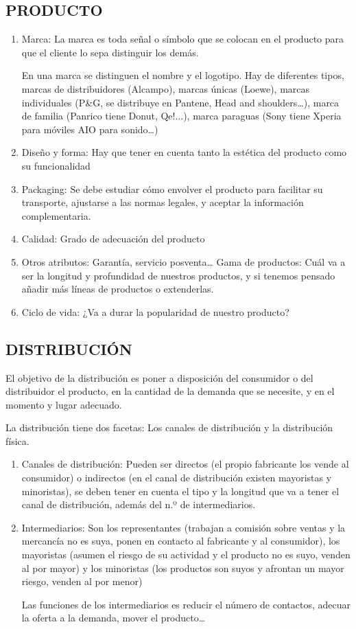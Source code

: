 \documentclass[12pt, twoside, openright]{report} %
\begin{document}
\subsection{PRODUCTO}
\begin{enumerate}
	\item Marca: La marca es toda señal o símbolo que se colocan en el producto para que el cliente lo sepa distinguir los demás.

En una marca se distinguen el nombre y el logotipo.
\pagebreak
Hay de diferentes tipos, marcas de distribuidores (Alcampo), marcas únicas (Loewe), marcas
individuales (P\&G, se distribuye en Pantene, Head and shoulders…), marca de familia (Panrico
tiene Donut, Qe!...), marca paraguas (Sony tiene Xperia para móviles AIO para sonido…)
	\item Diseño y forma: Hay que tener en cuenta tanto la estética del producto como su funcionalidad
	\item Packaging: Se debe estudiar cómo envolver el producto para facilitar su transporte, ajustarse a
las normas legales, y aceptar la información complementaria.
	\item Calidad: Grado de adecuación del producto
	\item Otros atributos: Garantía, servicio posventa…
Gama de productos: Cuál va a ser la longitud y profundidad de nuestros productos, y si
tenemos pensado añadir más líneas de productos o extenderlas.
	\item Ciclo de vida: ¿Va a durar la popularidad de nuestro producto?
\end{enumerate}

\subsection{DISTRIBUCIÓN}
El objetivo de la distribución es poner a disposición del consumidor o del distribuidor el producto, en
la cantidad de la demanda que se necesite, y en el momento y lugar adecuado.

La distribución tiene dos facetas: Los canales de distribución y la distribución física.
\begin{enumerate}
	\item Canales de distribución: Pueden ser directos (el propio fabricante los vende al consumidor) o
indirectos (en el canal de distribución existen mayoristas y minoristas), se deben tener en
cuenta el tipo y la longitud que va a tener el canal de distribución, además del n.º de
intermediarios.

	\item Intermediarios: Son los representantes (trabajan a comisión sobre ventas y la mercancía no es
suya, ponen en contacto al fabricante y al consumidor), los mayoristas (asumen el riesgo de su
actividad y el producto no es suyo, venden al por mayor) y los minoristas (los productos son
suyos y afrontan un mayor riesgo, venden al por menor)

Las funciones de los intermediarios es reducir el número de contactos, adecuar la oferta a la
demanda, mover el producto…
\end{enumerate}
\end{document}
